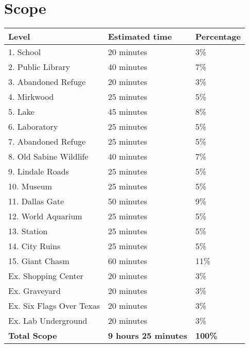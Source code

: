 \section{Scope}

\vspace*{0.5cm}

\begin{center}
	\begin{tabular}[c]{| p{6cm} | p{4cm} | p{3cm} |}
		\hline
		\textbf{Level} & \textbf{Estimated time} & \textbf{Percentage} \\
		\hline
		1. School & 20 minutes & 3\% \\
		\hline
		2. Public Library & 40 minutes & 7\% \\
		\hline
		3. Abandoned Refuge & 20 minutes & 3\% \\
		\hline
		4. Mirkwood & 25 minutes & 5\% \\
		\hline
		5. Lake & 45 minutes & 8\% \\
		\hline
		6. Laboratory & 25 minutes & 5\% \\
		\hline
		7. Abandoned Refuge & 25 minutes & 5\% \\
		\hline
		8. Old Sabine Wildlife & 40 minutes & 7\% \\
		\hline
		9. Lindale Roads & 25 minutes & 5\% \\
		\hline
		10. Museum & 25 minutes & 5\% \\
		\hline
		11. Dallas Gate & 50 minutes & 9\% \\
		\hline
		12. World Aquarium & 25 minutes & 5\% \\
		\hline
		13. Station & 25 minutes & 5\% \\
		\hline
		14. City Ruins & 25 minutes & 5\% \\
		\hline \rowcolor{light-light-gray}
		15. Giant Chasm & 60 minutes & 11\% \\
		\hline
		Ex. Shopping Center & 20 minutes & 3\% \\
		\hline
		Ex. Graveyard & 20 minutes & 3\% \\
		\hline
		Ex. Six Flags Over Texas & 20 minutes & 3\% \\
		\hline
		Ex. Lab Underground & 20 minutes & 3\% \\
		\hline \hline
		\textbf{Total Scope} & \textbf{9 hours 25 minutes} & \textbf{100\%} \\
		\hline
	\end{tabular}
\end{center}